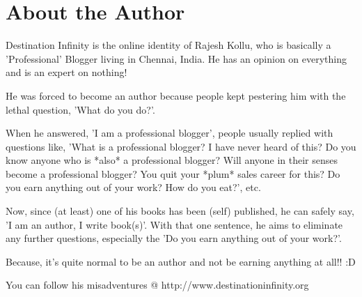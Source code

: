 \chapter{About the Author}

Destination Infinity is the online identity of Rajesh Kollu, who is basically a
'Professional' Blogger living in Chennai, India. He has an opinion on everything
and is an expert on nothing!

He was forced to become an author because people kept pestering him with the
lethal question, 'What do you do?'.

When he answered, 'I am a professional blogger', people usually replied with
questions like, 'What is a professional blogger? I have never heard of this? Do
you know anyone who is *also* a professional blogger? Will anyone in their
senses become a professional blogger? You quit your *plum* sales career for
this? Do you earn anything out of your work? How do you eat?', etc.

Now, since (at least) one of his books has been (self) published, he can safely
say, 'I am an author, I write book(s)'. With that one sentence, he aims to
eliminate any further questions, especially the 'Do you earn anything out of
your work?'.

Because, it's quite normal to be an author and not be earning anything at all!!
:D

You can follow his misadventures @ http://www.destinationinfinity.org